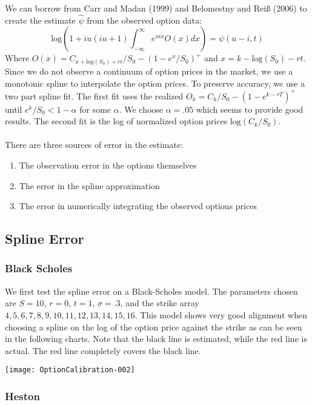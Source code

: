 \documentclass{article}
\begin{document}
We can borrow from Carr and Madan (1999) and  Belomestny and Reiß (2006) to create the estimate \(\hat{\psi}\) from the observed option data:
\[ \mathrm{log}\left(1+iu(iu+1)\int_{-\infty} ^{\infty} e^{uix} O(x) dx\right)=\psi(u-i, t)\]
Where \(O(x)=C_{x+\mathrm{log}(S_0)+rt}/S_0-\left(1-e^{x}/S_0\right)^+\) and \(x=k-\mathrm{log}(S_0)-rt\).  Since we do not observe a continuum of option prices in the market, we use a monotonic spline to interpolate the option prices.  To preserve accuracy, we use a two part spline fit.  The first fit uses the realized \(O_k=C_k/S_0-\left(1-e^{k-rT}\right)^+\) until \(e^{k}/S_0 < 1-\alpha\) for some \(\alpha\).  We choose \(\alpha=.05\) which seems to provide good results.  The second fit is the log of normalized option prices \(\mathrm{log}\left(C_k/S_0\right)\).
\\
\\
There are three sources of error in the estimate:
\begin{enumerate}
\item The observation error in the options themselves
\item The error in the spline approximation
\item The error in numerically integrating the observed options prices
\end{enumerate}

\subsection{Spline Error}

\subsubsection{Black Scholes}
We first test the spline error on a Black-Scholes model.  The parameters chosen are \(S=10\), \(r=0\), \(t=1\), \(\sigma=.3\), and the strike array \(4, 5, 6, 7, 8, 9, 10, 11, 12, 13, 14, 15, 16\).
This model shows very good alignment when choosing a spline on the log of the option price against the strike as can be seen in the following charts.  Note that the black line is estimated, while the red line is actual.  The red line completely covers the black line.


\texttt{[image: OptionCalibration-002]}


\subsubsection{Heston}
\end{document}

